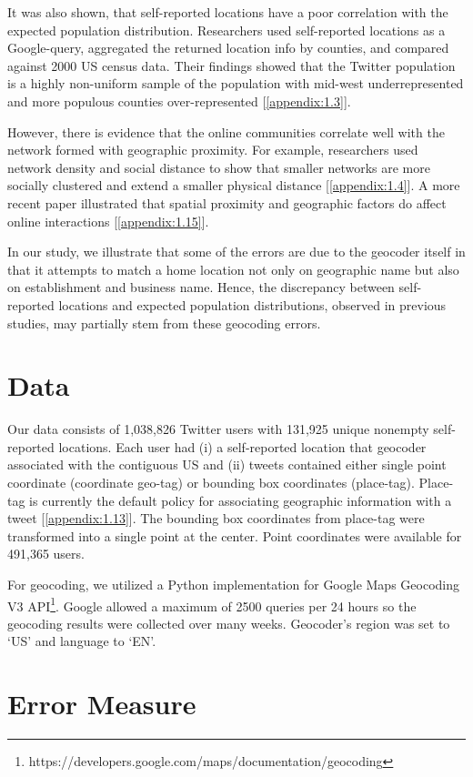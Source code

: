 It was also shown, that self-reported locations have a poor correlation with the expected population distribution. Researchers used self-reported locations as a Google-query, aggregated the returned location info by counties, and compared against 2000 US census data. Their findings showed that the Twitter population is a highly non-uniform sample of the population with mid-west underrepresented and more populous counties over-represented [\ref{appendix:1.3}].

However, there is evidence that the online communities correlate well with the network formed with geographic proximity. For example, researchers used network density and social distance to show that smaller networks are more socially clustered and extend a smaller physical distance [\ref{appendix:1.4}]. A more recent paper illustrated that spatial proximity and geographic factors do affect online interactions [\ref{appendix:1.15}]. 

In our study, we illustrate that some of the errors are due to the geocoder itself in that it attempts to match a home location not only on geographic name but also on establishment and business name. Hence, the discrepancy between self-reported locations and expected population distributions, observed in previous studies, may partially stem from these geocoding errors. 
\section{Data}
Our data consists of 1,038,826 Twitter users with 131,925 unique nonempty self-reported locations. Each user had (i) a self-reported location that geocoder associated with the contiguous US and (ii) tweets contained either single point coordinate (coordinate geo-tag) or bounding box coordinates (place-tag). Place-tag is currently the default policy for associating geographic information with a tweet [\ref{appendix:1.13}]. The bounding box coordinates from place-tag were transformed into a single point at the center. Point coordinates were available for 491,365 users. 

For geocoding, we utilized a Python implementation for Google Maps Geocoding V3 API\footnote{https://developers.google.com/maps/documentation/geocoding}. Google allowed a maximum of 2500 queries per 24 hours so the geocoding results were collected over many weeks. Geocoder's region was set to `US' and language to `EN'. 

\section{Error Measure}


